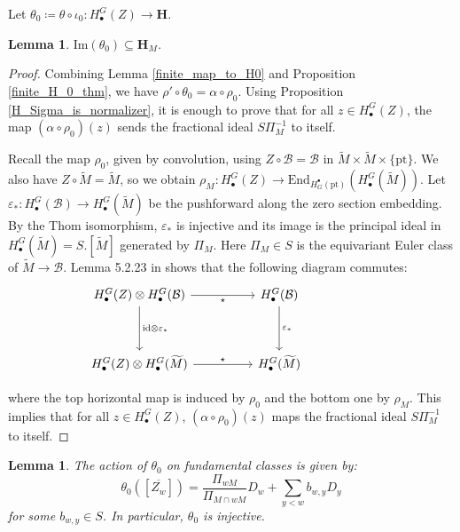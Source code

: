 \documentclass[11pt]{article}
\newcommand{\B}{\mathcal{B}}
\renewcommand{\H}{\textbf{H}}
\newcommand{\1}{\mathbb{1}}
\newcommand{\HBM}[2]{H_\bullet^{#1}(#2)}
\newcommand{\tM}{\widetilde{M}}
\newcommand{\End}{\text{End}}
\newcommand{\pt}{\text{pt}}
\renewcommand{\subset}{\subseteq}
\renewcommand{\Im}{\text{Im}}
\newtheorem{lemma}[theorem]{Lemma}
\theoremstyle{definition}
\numberwithin{equation}{section}
\begin{document}
Let $\theta_0 \coloneqq \theta \circ\iota_0: \HBM{G}{Z}\rightarrow \H$.

\begin{lemma}
\label{finite_Image_in_HM}
    $\Im(\theta_0) \subset \H_M$.
\end{lemma}

\begin{proof}
    Combining Lemma \ref{finite_map_to_H0} and Proposition \ref{finite_H_0_thm}, we have $\rho' \circ \theta_0 = \alpha \circ \rho_0$. Using Proposition \ref{H_Sigma_is_normalizer}, it is enough to prove that for all $z\in \HBM{G}{Z}$, the map $(\alpha\circ \rho_0)(z)$ sends the fractional ideal $S \Pi_M^{-1}$ to itself.

    Recall the map $\rho_0$, given by convolution, using $Z\circ\B = \B$ in $\tM \times \tM \times \{\pt\}$. We also have $Z\circ \tM = \tM$, so we obtain $\rho_M : \HBM{G}{Z} \rightarrow\End_{H_G^\bullet(\pt)}\left(\HBM{G}{\tM}\right)$. Let $\varepsilon_* : \HBM{G}{\B} \rightarrow \HBM{G}{\tM}$ be the pushforward along the zero section embedding. By the Thom isomorphism, $\varepsilon_*$ is injective and its image is the principal ideal in $\HBM{G}{\tM} = S.[\tM]$ generated by $\Pi_M$. Here $\Pi_M \in S$ is the equivariant Euler class of $\tM \rightarrow \B$. Lemma 5.2.23 in \cite{CG} shows that the following diagram commutes:
    \[\begin{tikzcd}
	\HBM{G}{Z} \otimes \HBM{G}{\B} && \HBM{G}{\B} \\
	\\
	\HBM{G}{Z} \otimes \HBM{G}{\tM} && \HBM{G}{\tM}&& 
	\arrow["\star"', from=1-1, to=1-3]
	\arrow["\text{id} \otimes \varepsilon_*", from=1-1, to=3-1]
	\arrow["\varepsilon_*", from=1-3, to=3-3]
	\arrow["\star",from=3-1, to=3-3]
\end{tikzcd}\]

\noindent where the top horizontal map is induced by $\rho_0$ and the bottom one by $\rho_M$. This implies that for all $z\in \HBM{G}{Z}$, $(\alpha\circ \rho_0)(z)$ maps the fractional ideal $S \Pi_M^{-1}$ to itself.

\end{proof}

\begin{lemma}
\label{finite_leading_term_ZW}
    The action of $\theta_0$ on fundamental classes is given by:
    $$\theta_0\left(\left[\overline{Z_w}\right]\right) = \frac{\Pi_{wM}}{\Pi_{M\cap wM}} D_w + \sum_{y < w} b_{w,y} D_y$$
    for some $b_{w,y} \in S$.
    In particular, $\theta_0$ is injective.
\end{lemma}
\end{document}
